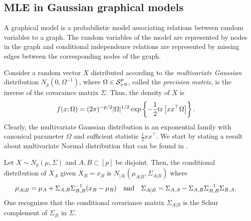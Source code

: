 \subsection{MLE in Gaussian graphical models}

A graphical model is a probabilistic model associating relations between random variables to a graph. The random variables of the model are represented by nodes in the graph and conditional independence relations are represented by missing edges between the corresponding nodes of the graph.

Consider a random vector $X$ distributed according to the \textit{multivariate Gaussian} distribution $N_p(0, \Omega^{-1})$, where $\Omega \in \S^p_{\succ 0}$, called the \textit{precision matrix}, is the inverse of the covaraince matrix $\Sigma$. Thus, the density of $X$ is
\begin{equation} \label{eq-density-gaussian}
    f(x; \Omega) = (2\pi)^{-p/2} |\Omega|^{1/2} \expfc{-\frac{1}{2} \trB{xx^\top \Omega} }.
\end{equation}
Clearly, the multivariate Gaussian distribution is an exponential family with canonical parameter $\Omega$ and sufficient statistic $\frac{1}{2}xx^\top$. We start by stating a result about multivariate Normal distribution that can be found in \cite[Proposition C.5]{lauritzen1996}. 

\begin{lemma} \label{lem-gaussian-cond}
    Let $X \sim N_p(\mu, \Sigma)$ and $A, B \subset [p]$ be disjoint. Then, the conditional distribution of $X_A$ given $X_B = x_B$ is $N_{|A|}(\mu_{A|B}, \Sigma_{A|B})$ where
    \begin{align*}
        \mu_{A|B} = \mu_A + \Sigma_{A,B}\Sigma^{-1}_{B,B}(x_B - \mu_B) && \t{and} && \Sigma_{A|B} = \Sigma_{A,A} - \Sigma_{A,B}\Sigma^{-1}_{B,B}\Sigma_{B,A}.
    \end{align*} 
    One recognizes that the conditional covariance matrix $\Sigma_{A|B}$ is the Schur complement of $\Sigma_B$ in $\Sigma$.
\end{lemma}

